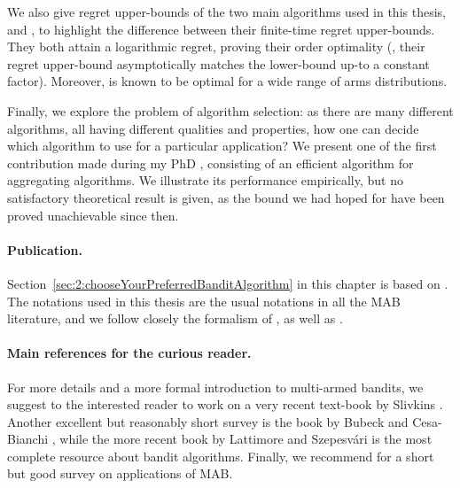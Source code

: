 We also give regret upper-bounds of the two main algorithms used in this thesis, \UCB{} and \klUCB, to highlight the difference between their finite-time regret upper-bounds. They both attain a logarithmic regret, proving their order optimality (\ie, their regret upper-bound asymptotically matches the lower-bound up-to a constant factor). Moreover, \klUCB{} is known to be optimal for a wide range of arms distributions.

Finally, we explore the problem of algorithm selection: as there are many different algorithms, all having different qualities and properties, how one can decide which algorithm to use for a particular application?
We present one of the first contribution made during my PhD \cite{Besson2018WCNC}, consisting of an efficient algorithm for aggregating algorithms.
We illustrate its performance empirically, but no satisfactory theoretical result is given, as the bound we had hoped for have been proved unachievable since then.


\paragraph{Publication.}
%
Section~\ref{sec:2:chooseYourPreferredBanditAlgorithm} in this chapter is based on \cite{Besson2018WCNC}.
The notations used in this thesis are the usual notations in all the MAB literature, and we follow closely the formalism of \cite{Kaufmann12PhD}, as well as \cite{Slivkins2019,LattimoreBanditAlgorithmsBook,Bubeck12}.


\paragraph{Main references for the curious reader.}
%
For more details and a more formal introduction to multi-armed bandits, we suggest to the interested reader to work on a very recent text-book by Slivkins \cite{Slivkins2019}.
Another excellent but reasonably short survey is the book by Bubeck and Cesa-Bianchi \cite{Bubeck12}, while the more recent book by Lattimore and Szepesv{\'a}ri \cite{LattimoreBanditAlgorithmsBook} is the most complete resource about bandit algorithms.
Finally, we recommend \cite{bouneffouf2019survey} for a short but good survey on applications of MAB.


\newpage
\graphicspath{{2-Chapters/2-Chapter/Images/}}


